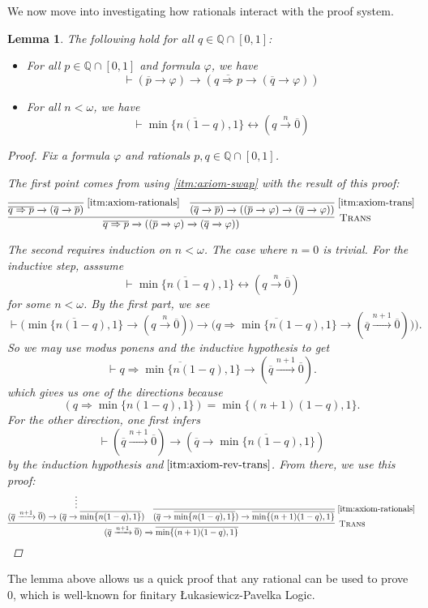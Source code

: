 \documentclass{amsart}
\newtheorem{lemma}[theorem]{Lemma}
\theoremstyle{definition}
\numberwithin{equation}{theorem}
\renewcommand{\phi}{\varphi}
\newcommand{\Q}{\mathbb{Q}}
\newcommand{\proves}{\vdash}
\newcommand{\rat}[1]{{\overline{#1}}}
\newcommand{\narrow}[1]{\xrightarrow{#1}}
\renewcommand{\to}{\narrow{}}
\newcommand{\trans}{\text{\sc{Trans}}}
\newcommand{\aref}[1]{\!\text{\ref{itm:axiom-#1}}}
\newcommand{\luk}{{\L}ukasiewicz}
\begin{document}
We now move into investigating how rationals interact with the proof system.
\begin{lemma}\label{lem:rationals-basic}
	The following hold for all $q\in\Q\cap[0,1]$:
  \begin{itemize}
  \item For all $p\in\Q\cap[0,1]$ and formula $\phi$, we have
	  \[
	    \proves(\rat p\to\phi)\to(\rat{q\Rightarrow p}\to(\rat q\to\phi))
	  \]
  \item For all $n<\omega$, we have
	  \[
	    \proves\rat{\min\{n(1-q),1\}}\leftrightarrow(q\narrow n\rat 0)
	  \]
  \end{itemize}
  \begin{proof}
    Fix a formula $\phi$ and rationals $p,q\in\Q\cap[0,1]$.
  
    The first point comes from using \ref{itm:axiom-swap} with the result of this proof:
    \[
      \infer[\trans]{\rat{q\Rightarrow p}\to((\rat p\to\phi)\to(\rat q\to\phi))}{
        \infer[\aref{rationals}]{\rat{q\Rightarrow p}\to(\rat q\to\rat p)}{} &
        \infer[\aref{trans}]{(\rat q\to\rat p)\to((\rat p\to\phi)\to(\rat q\to\phi))}{}
      }
    \]
    
    The second requires induction on $n<\omega$.
    The case where $n=0$ is trivial.
    For the inductive step, asssume
    \[
      \proves\rat{\min\{n(1-q),1\}}\leftrightarrow(q\narrow n\rat 0)
    \]
    for some $n<\omega$.
    By the first part, we see
    \[
      \proves\Big(\rat{\min\{n(1-q),1\}}\to(q\narrow n\rat 0)\Big)\to\Big(\rat{q\Rightarrow\min\{n(1-q),1\}}\to(\rat q\narrow{n+1}\rat 0))\Big).
    \]
    So we may use modus ponens and the inductive hypothesis to get
    \[
      \proves\rat{q\Rightarrow\min\{n(1-q),1\}}\to(\rat q\narrow{n+1}\rat 0).
    \]
    which gives us one of the directions because
    \[
      (q\Rightarrow\min\{n(1-q),1\})=\min\{(n+1)(1-q), 1\}.
    \]
    For the other direction, one first infers
    \[
      \proves(\rat q\narrow{n+1}\rat 0)\to(\rat q\to\rat{\min\{n(1-q),1\}})
    \]
    by the induction hypothesis and $\aref{rev-trans}$.
    From there, we use this proof:
    \[
      \infer[\trans]{(\rat q\narrow{n+1}\rat 0)\to\rat{\min\{(n+1)(1-q),1\}}}{
        \infer*{(\rat q\narrow{n+1}\rat 0)\to(\rat q\to\rat{\min\{n(1-q),1\}})}{} &
        \infer[\aref{rationals}]{(\rat q\to\rat{\min\{n(1-q),1\}})\to\rat{\min\{(n+1)(1-q),1\}}}{}
      }\qedhere
    \]
  \end{proof}
\end{lemma}
The lemma above allows us a quick proof that any rational can be used to prove 0, which is well-known for finitary {\luk}-Pavelka Logic.
\end{document}
